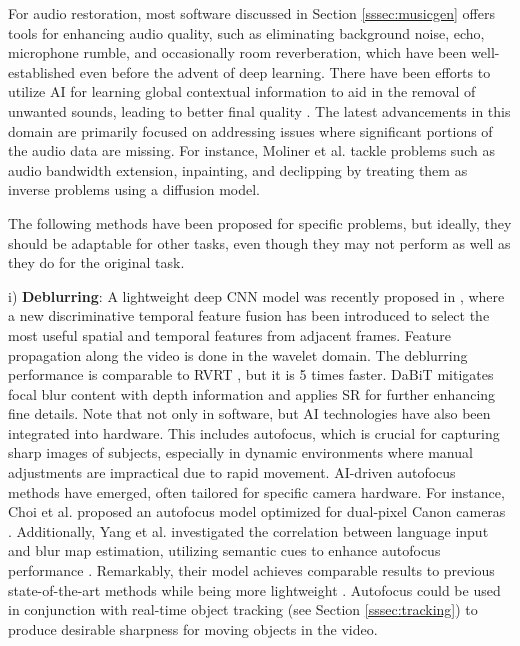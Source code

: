 \documentclass[11pt,a4paper]{article}
\begin{document}
For audio restoration, most software discussed in Section \ref{sssec:musicgen} offers tools for enhancing audio quality, such as eliminating background noise, echo, microphone rumble, and occasionally room reverberation, which have been well-established even before the advent of deep learning. There have been efforts to utilize AI for learning global contextual information to aid in the removal of unwanted sounds, leading to better final quality \cite{Yu:DBT:2022}. The latest advancements in this domain are primarily focused on addressing issues where significant portions of the audio data are missing. For instance, Moliner et al. \cite{Moliner:solving:2023} tackle problems such as audio bandwidth extension, inpainting, and declipping by treating them as inverse problems using a diffusion model.

The following methods have been proposed for specific problems, but ideally, they should be adaptable for other tasks, even though they may not perform as well as they do for the original task.
 
i) \textbf{Deblurring}: A lightweight deep CNN model was recently proposed in \cite{Pan:Deep:2023}, where a new discriminative temporal feature fusion has been introduced to select the most useful spatial and temporal features from adjacent frames. Feature propagation along the video is done in the wavelet domain. The deblurring performance is comparable to RVRT \cite{liang:RVRT:2022}, but it is 5 times faster. DaBiT \cite{Morris:DaBiT:2024} mitigates focal blur content with depth information and applies SR for further enhancing fine details.
Note that not only in software, but AI technologies have also been integrated into hardware. This includes autofocus, which is crucial for capturing sharp images of subjects, especially in dynamic environments where manual adjustments are impractical due to rapid movement. AI-driven autofocus methods have emerged, often tailored for specific camera hardware. For instance, Choi et al. proposed an autofocus model optimized for dual-pixel Canon cameras \cite{Choi:Exploring:2023}. Additionally, Yang et al. investigated the correlation between language input and blur map estimation, utilizing semantic cues to enhance autofocus performance \cite{yang:ldp:2023}. Remarkably, their model achieves comparable results to previous state-of-the-art methods while being more lightweight \cite{Yang:K3DN:2023}. Autofocus could be used in conjunction with real-time object tracking (see Section \ref{sssec:tracking}) to produce desirable sharpness for moving objects in the video.
\end{document}
